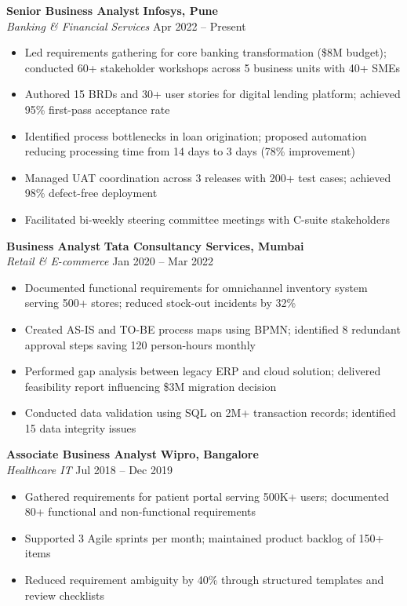 \documentclass[10pt,a4paper]{article}
\begin{document}
\textbf{Senior Business Analyst} \hfill \textbf{Infosys, Pune}\\
\textit{Banking \& Financial Services} \hfill Apr 2022 -- Present
\begin{itemize}
  \item Led requirements gathering for core banking transformation (\$8M budget); conducted 60+ stakeholder workshops across 5 business units with 40+ SMEs
  \item Authored 15 BRDs and 30+ user stories for digital lending platform; achieved 95\% first-pass acceptance rate
  \item Identified process bottlenecks in loan origination; proposed automation reducing processing time from 14 days to 3 days (78\% improvement)
  \item Managed UAT coordination across 3 releases with 200+ test cases; achieved 98\% defect-free deployment
  \item Facilitated bi-weekly steering committee meetings with C-suite stakeholders
\end{itemize}

\textbf{Business Analyst} \hfill \textbf{Tata Consultancy Services, Mumbai}\\
\textit{Retail \& E-commerce} \hfill Jan 2020 -- Mar 2022
\begin{itemize}
  \item Documented functional requirements for omnichannel inventory system serving 500+ stores; reduced stock-out incidents by 32\%
  \item Created AS-IS and TO-BE process maps using BPMN; identified 8 redundant approval steps saving 120 person-hours monthly
  \item Performed gap analysis between legacy ERP and cloud solution; delivered feasibility report influencing \$3M migration decision
  \item Conducted data validation using SQL on 2M+ transaction records; identified 15 data integrity issues
\end{itemize}

\textbf{Associate Business Analyst} \hfill \textbf{Wipro, Bangalore}\\
\textit{Healthcare IT} \hfill Jul 2018 -- Dec 2019
\begin{itemize}
  \item Gathered requirements for patient portal serving 500K+ users; documented 80+ functional and non-functional requirements
  \item Supported 3 Agile sprints per month; maintained product backlog of 150+ items
  \item Reduced requirement ambiguity by 40\% through structured templates and review checklists
\end{itemize}
\end{document}
